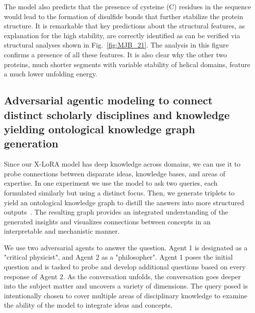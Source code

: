 The model also predicts that the presence of cysteine (C) residues in the sequence would lead to the formation of disulfide bonds that further stabilize the protein structure.  It is remarkable that key predictions about the structural features, as explanation for the high stability, are correctly identified as can be verified via structural analyses shown in Fig.~\ref{fig:MJB_21}.  The analysis in this figure confirms a presence of all these features. It is also clear why the other two proteins, much shorter segments with variable stability of helical domains, feature a much lower unfolding energy. 


 







\subsection{Adversarial agentic modeling to connect distinct scholarly disciplines and knowledge yielding ontological knowledge graph generation}

Since our X-LoRA model has deep knowledge across domains, we can use it to probe connections between disparate ideas, knowledge bases, and areas of expertise. In one experiment we use the model to ask two queries, each formulated similarly but using a distinct focus. Then, we generate triplets to yield an ontological knowledge graph to distill the answers into more structured outputs~\cite{Giesa2012CategoryDesign,Spivak2011ReoccurringAnalogies}. The resulting graph provides an integrated understanding of the generated insights and visualizes connections between concepts in an interpretable and mechanistic manner. 

We use two adversarial agents to answer the question. Agent 1 is designated as a "critical physicist", and Agent 2 as a "philosopher". Agent 1 poses the initial question and is tasked to probe and develop additional questions based on every response of Agent 2. As the conversation unfolds, the conversation goes deeper into the subject matter and uncovers a variety of dimensions.  The query posed is intentionally chosen to cover multiple areas of disciplinary knowledge to examine the ability of the model to integrate ideas and concepts. 

